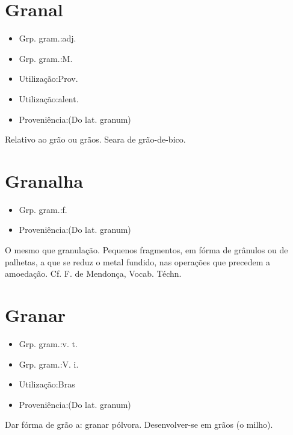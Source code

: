 \section{Granal}
\begin{itemize}
\item {Grp. gram.:adj.}
\end{itemize}
\begin{itemize}
\item {Grp. gram.:M.}
\end{itemize}
\begin{itemize}
\item {Utilização:Prov.}
\end{itemize}
\begin{itemize}
\item {Utilização:alent.}
\end{itemize}
\begin{itemize}
\item {Proveniência:(Do lat. \textunderscore granum\textunderscore )}
\end{itemize}
Relativo ao grão ou grãos.
Seara de grão-de-bico.
\section{Granalha}
\begin{itemize}
\item {Grp. gram.:f.}
\end{itemize}
\begin{itemize}
\item {Proveniência:(Do lat. \textunderscore granum\textunderscore )}
\end{itemize}
O mesmo que \textunderscore granulação\textunderscore .
Pequenos fragmentos, em fórma de grânulos ou de palhetas, a que se reduz o metal fundido, nas operações que precedem a amoedação. Cf. F. de Mendonça, \textunderscore Vocab. Téchn.\textunderscore 
\section{Granar}
\begin{itemize}
\item {Grp. gram.:v. t.}
\end{itemize}
\begin{itemize}
\item {Grp. gram.:V. i.}
\end{itemize}
\begin{itemize}
\item {Utilização:Bras}
\end{itemize}
\begin{itemize}
\item {Proveniência:(Do lat. \textunderscore granum\textunderscore )}
\end{itemize}
Dar fórma de grão a: \textunderscore granar pólvora\textunderscore .
Desenvolver-se em grãos (o milho).
